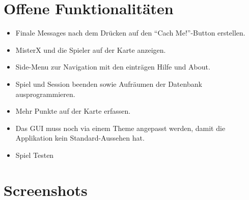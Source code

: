 \documentclass[11pt]{article}
\begin{document}
\section{Offene Funktionalitäten}
\begin{itemize}
\item Finale Messages nach dem Drücken auf den ``Cach Me!''-Button erstellen.
\item MisterX und die Spieler auf der Karte anzeigen.
\item Side-Menu zur Navigation mit den einträgen Hilfe und About.
\item Spiel und Session beenden sowie Aufräumen der Datenbank ausprogrammieren.
\item Mehr Punkte auf der Karte erfassen.
\item Das GUI muss noch via einem Theme angepasst werden, damit die Applikation kein Standard-Aussehen hat.
\item Spiel Testen
\end{itemize}
 

\section{Screenshots}
\end{document}
